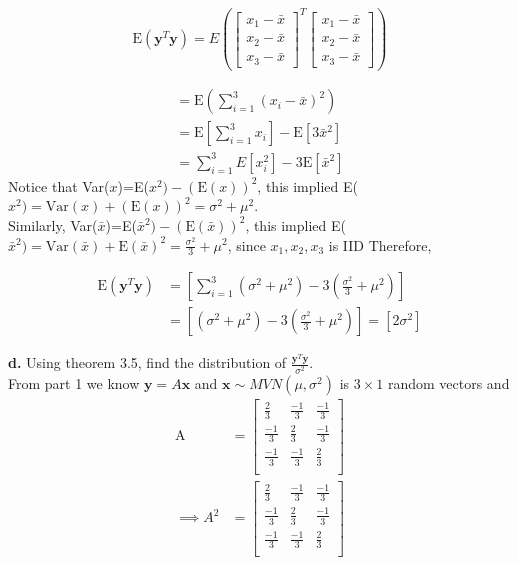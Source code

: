\documentclass[12 pt, a4paper]{article}
\begin{document}
\[\text{E}(\textbf{y}^T\textbf{y}) = E \left(
\begin{bmatrix}
x_1-\bar{x} \\ x_2-\bar{x} \\ x_3-\bar{x}
\end{bmatrix}^T
\begin{bmatrix}
x_1-\bar{x} \\ x_2-\bar{x} \\ x_3-\bar{x}
\end{bmatrix} \right)
\]

\begin{align*}
=\text{E}\left(\sum_{i=1}^3(x_i-\bar{x})^2\right) \\
=\text{E}\left[\sum_{i=1}^3x_i \right]-\text{E}\left[3\bar{x}^2\right]\\
=\sum_{i=1}^3E[x_i^2]-3\text{E}[\bar{x}^2]
\end{align*}
Notice that Var($x$)=E($x^2)-(\text{E}(x))^2$,  this implied E($x^2) = \text{Var}(x)+(\text{E}(x))^2 = \sigma^2+\mu^2$. \\
Similarly, Var($\bar{x}$)=E($\bar{x}^2)-(\text{E}(\bar{x}))^2$, this implied E($\bar{x}^2)= \text{Var}(\bar{x})+\text{E}(\bar{x}) ^2=\frac{\sigma^2}{3}+\mu^2$, since $x_1,x_2,x_3$ is IID Therefore, 

\begin{align*}
\text{E}(\textbf{y}^T\textbf{y}) &=\left[ \sum_{i=1}^3(\sigma^2+\mu^2) - 3\left(\frac{\sigma^2}{3}+\mu^2 \right)\right]\\
& = \left[(\sigma^2+\mu^2)-3\left(\frac{\sigma^2}{3}+\mu^2 \right)\right]= \left[2\sigma^2 \right]
\end{align*}

\noindent \textbf{d.} Using theorem 3.5, find the distribution of $\frac{\textbf{y}^T\textbf{y}}{\sigma^2}$. \\

\noindent From part 1 we know $\textbf{y}=A\textbf{x}$ and $\textbf{x}\sim MVN(\mu,\sigma^2)$ is $3 \times 1$ random vectors and
\begin{align*}
\text{A}& =
\begin{bmatrix}
\frac{2}{3} & \frac{-1}{3} & \frac{-1}{3} \\
 \frac{-1}{3} & \frac{2}{3} & \frac{-1}{3} \\
 \frac{-1}{3} & \frac{-1}{3} & \frac{2}{3} \\
\end{bmatrix} \\
\implies A^2&=
\begin{bmatrix}
\frac{2}{3} & \frac{-1}{3} & \frac{-1}{3} \\
 \frac{-1}{3} & \frac{2}{3} & \frac{-1}{3} \\
 \frac{-1}{3} & \frac{-1}{3} & \frac{2}{3} \\
\end{bmatrix}
\end{align*}
\end{document}
